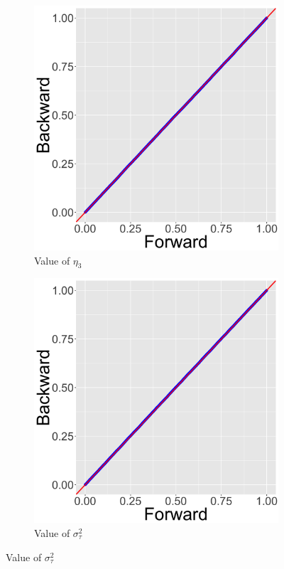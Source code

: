 \documentclass[ba]{imsart}
\numberwithin{equation}{section}
\theoremstyle{plain}
\begin{document}
\begin{figure}[H]
\begin{subfigure}[b]{0.2425\textwidth}
   		     		   	   	\end{subfigure}   	   		   	   	
   		   	     		   	   	\begin{subfigure}[b]{0.2425\textwidth}
   		   	     		   	   		\caption{Value of $\eta_3$}
   		   	     		   	   		\includegraphics[width=\textwidth]{img/plot11.png}	
   		   	     		   	   	\end{subfigure}   	   		   	   	  		   	   	 	
   		   	     		   	   		     		   	   	\begin{subfigure}[b]{0.2425\textwidth}
   		   	     		   	   		     		   	   		\caption{Value of $\sigma^2_\tau$}
   		   	     		   	   		     		   	   		\includegraphics[width=\textwidth]{img/plot12.png}	

\end{subfigure}
\end{figure}
\end{document}
